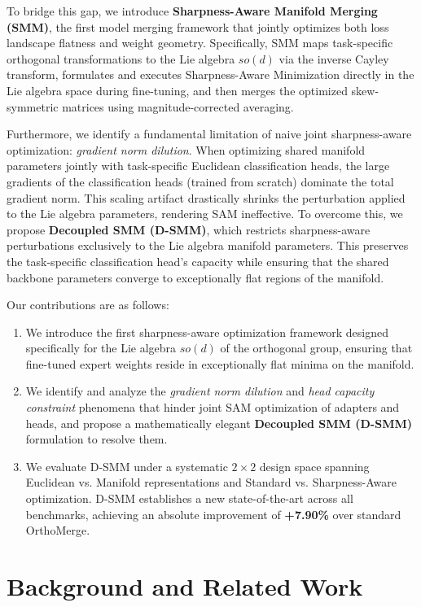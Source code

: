 \documentclass{article}
\theoremstyle{plain}
\theoremstyle{definition}
\theoremstyle{remark}
\begin{document}
To bridge this gap, we introduce \textbf{Sharpness-Aware Manifold Merging (SMM)}, the first model merging framework that jointly optimizes both loss landscape flatness and weight geometry. Specifically, SMM maps task-specific orthogonal transformations to the Lie algebra $so(d)$ via the inverse Cayley transform, formulates and executes Sharpness-Aware Minimization directly in the Lie algebra space during fine-tuning, and then merges the optimized skew-symmetric matrices using magnitude-corrected averaging.

Furthermore, we identify a fundamental limitation of naive joint sharpness-aware optimization: \textit{gradient norm dilution}. When optimizing shared manifold parameters jointly with task-specific Euclidean classification heads, the large gradients of the classification heads (trained from scratch) dominate the total gradient norm. This scaling artifact drastically shrinks the perturbation applied to the Lie algebra parameters, rendering SAM ineffective. To overcome this, we propose \textbf{Decoupled SMM (D-SMM)}, which restricts sharpness-aware perturbations exclusively to the Lie algebra manifold parameters. This preserves the task-specific classification head's capacity while ensuring that the shared backbone parameters converge to exceptionally flat regions of the manifold.

Our contributions are as follows:
\begin{enumerate}
    \item We introduce the first sharpness-aware optimization framework designed specifically for the Lie algebra $so(d)$ of the orthogonal group, ensuring that fine-tuned expert weights reside in exceptionally flat minima on the manifold.
    \item We identify and analyze the \textit{gradient norm dilution} and \textit{head capacity constraint} phenomena that hinder joint SAM optimization of adapters and heads, and propose a mathematically elegant \textbf{Decoupled SMM (D-SMM)} formulation to resolve them.
    \item We evaluate D-SMM under a systematic $2\times2$ design space spanning Euclidean vs. Manifold representations and Standard vs. Sharpness-Aware optimization. D-SMM establishes a new state-of-the-art across all benchmarks, achieving an absolute improvement of \textbf{+7.90\%} over standard OrthoMerge.
\end{enumerate}

\section{Background and Related Work}
\label{sec:related}
\end{document}
